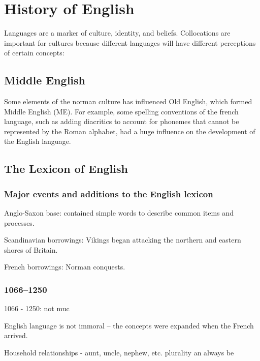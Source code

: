 \documentclass[../main.tex]{subfiles}
\begin{document}
	\section{History of English}
	Languages are a marker of culture, identity, and beliefs.
	Collocations are important for cultures because different languages will have different perceptions of certain concepts:

	\subsection{Middle English}
	Some elements of the norman culture has influenced Old English, which formed Middle English (ME). For example, some spelling conventions of the french language, such as adding diacritics to account for phonemes that cannot be represented by the Roman alphabet, had a huge influence on the development of the English language.

	\subsection{The Lexicon of English}
	\subsubsection{Major events and additions to the English lexicon}
	Anglo-Saxon base: contained simple words to describe common items and processes.  \par
	Scandinavian borrowings: Vikings began attacking the northern and eastern shores of Britain.  \par
	French borrowings: Norman conquests. \par
	\subsubsection{1066--1250}
	1066 - 1250: not muc \par
	English language is not immoral -- the concepts were expanded when the French arrived.  \par
	Household relationships - aunt, uncle, nephew, etc. plurality an always be \par
\end{document}

